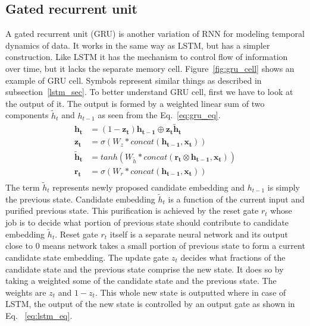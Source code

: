 \documentclass[10pt,twocolumn,letterpaper]{article}
\begin{document}
\subsection{Gated recurrent unit}
A gated recurrent unit (GRU) is another variation of RNN for modeling temporal dynamics of data. It works in the same way as LSTM, but has a simpler construction. Like LSTM it has the mechanism to control flow of information over time, but it lacks the separate memory cell. 
Figure~\ref{fig:gru_cell} shows an example of GRU cell. Symbols represent similar things as described in subsection~\ref{lstm_sec}. 
To better understand GRU cell, first we have to look at the output of it. The output is formed by a weighted linear sum of two components $\tilde{h}_t$ and $h_{t-1}$ as seen from the Eq.~\ref{eq:gru_eq}. 
\begin{equation}
	\label{eq:gru_eq}
	\begin{aligned}
		\mathbf{h_t} & = (1-\mathbf{z_{t}})\mathbf{h_{t-1}} \oplus \mathbf{z_{t}}\mathbf{\tilde{h}_t} \\
		\mathbf{z_{t}} &= \sigma(W_z*concat(\mathbf{h_{t-1}}, \mathbf{x_t})) \\
		\mathbf{\tilde{h}_t} &= tanh(W_{\tilde{h}}*concat(\mathbf{r_t} \otimes \mathbf{h_{t-1}}, \mathbf{x_t})) \\
		\mathbf{r_t} &= \sigma(W_r*concat(\mathbf{h_{t-1}}, \mathbf{x_t})) \\
	\end{aligned}
\end{equation}
The term $\tilde{h}_t$ represents newly proposed candidate embedding and $h_{t-1}$ is simply the previous state. Candidate embedding $\tilde{h}_t$ is a function of the current input and purified previous state. This purification is achieved by the reset gate $r_{t}$ whose job is to decide what portion of previous state should contribute to candidate embedding $\tilde{h}_t$. Reset gate $r_{t}$ itself is a separate neural network and its output close to $0$ means network takes a small portion of previous state to form a current candidate state embedding. The update gate $z_{t}$ decides what fractions of the candidate state and the previous state comprise the new state. It does so by taking a weighted some of the candidate state and the previous state. The weights are $z_{t}$ and $1-z_{t}$. This whole new state is outputted where in case of LSTM, the output of the new state is controlled by an output gate as shown in Eq. ~\ref{eq:lstm_eq}.  
\end{document}
